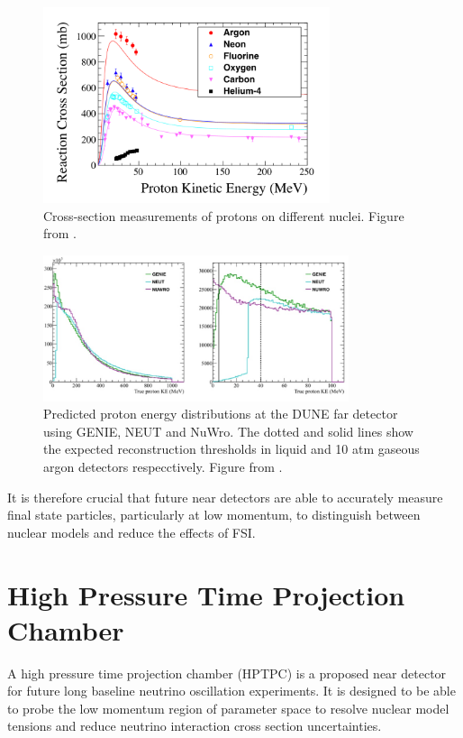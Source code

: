 \begin{figure}
\centering
\includegraphics*[width=0.75\textwidth,clip]{figs/nucxsec}
\caption{Cross-section measurements of protons on different nuclei. Figure from \cite{hptpcprop}.}\label{fig:nucxsec}
\end{figure}

\begin{figure}
\centering
\includegraphics*[width=0.8\textwidth,clip]{figs/neutgenienuwro}
\caption{Predicted proton energy distributions at the DUNE far detector using GENIE, NEUT and NuWro. The dotted and solid lines show the expected reconstruction thresholds in liquid and 10 atm gaseous argon detectors respecctively. Figure from \cite{dunehptpc}.}\label{fig:generators}
\end{figure}

It is therefore crucial that future near detectors are able to accurately measure final state particles, particularly at low momentum, to distinguish between nuclear models and reduce the effects of FSI.

\section{High Pressure Time Projection Chamber}

A high pressure time projection chamber (HPTPC) is a proposed near detector for future long baseline neutrino oscillation experiments. It is designed to be able to probe the low momentum region of parameter space to resolve nuclear model tensions and reduce neutrino interaction cross section uncertainties.

